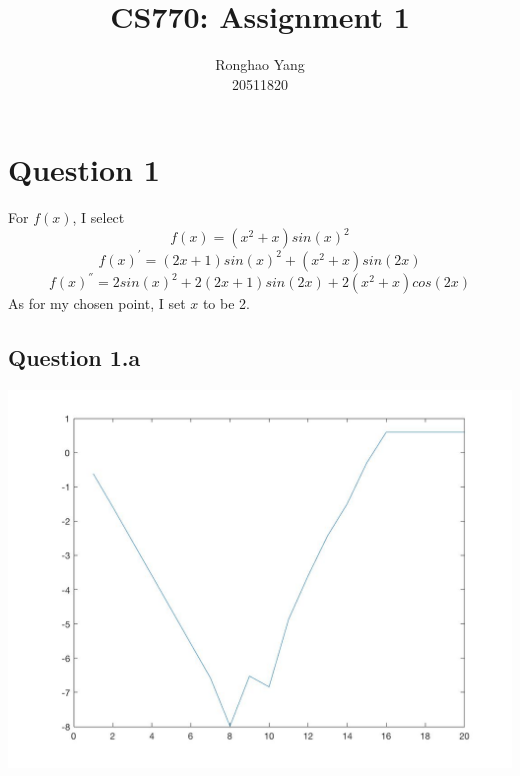 \documentclass[11pt]{article} %
\title{CS770: Assignment 1}
\author{Ronghao Yang\\20511820}
\begin{document}
\maketitle

\section{Question 1}
For $f(x)$, I select \begin{equation}f(x) = (x^{2}+x)sin(x)^{2}\end{equation}\begin{equation}f(x)^{'}=(2x+1)sin(x)^{2}+(x^{2}+x)sin(2x)\end{equation}\begin{equation}f(x)^{''} = 2sin(x)^{2}+2(2x+1)sin(2x)+2(x^{2}+x)cos(2x)\end{equation} As for my chosen point, I set $x$ to be 2.

\subsection{Question 1.a}
\includegraphics[scale=0.4]{q11.jpg}
\end{document}
